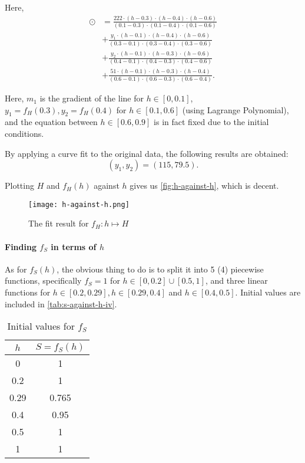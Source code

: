 Here,
\begin{align*}
    \odot & = \frac{222 \cdot (h - 0.3) \cdot (h - 0.4) \cdot (h - 0.6)}{(0.1 - 0.3) \cdot (0.1 - 0.4) \cdot (0.1 - 0.6)} \\
          & + \frac{y_1 \cdot (h - 0.1) \cdot (h - 0.4) \cdot (h - 0.6)}{(0.3 - 0.1) \cdot (0.3 - 0.4) \cdot (0.3 - 0.6)} \\
          & + \frac{y_2 \cdot (h - 0.1) \cdot (h - 0.3) \cdot (h - 0.6)}{(0.4 - 0.1) \cdot (0.4 - 0.3) \cdot (0.4 - 0.6)} \\
          & + \frac{51 \cdot (h - 0.1) \cdot (h - 0.3) \cdot (h - 0.4)}{(0.6 - 0.1) \cdot (0.6 - 0.3) \cdot (0.6 - 0.4)}.
\end{align*}

Here, \(m_1\) is the gradient of the line for \(h \in [0, 0.1]\), \(y_1 = f_H(0.3), y_2 = f_H(0.4)\) for \(h \in [0.1, 0.6]\) (using Lagrange Polynomial), and the equation between \(h \in [0.6, 0.9]\) is in fact fixed due to the initial conditions.

By applying a curve fit to the original data, the following results are obtained:
\[
    (y_1, y_2) = (115, 79.5).
\]

Plotting \(H\) and \(f_H(h)\) against \(h\) gives us \autoref{fig:h-against-h}, which is decent.

\begin{figure}[htp]
    \centering
    \texttt{[image: h-against-h.png]}
    \caption{The fit result for \(f_H: h \mapsto H\)}
    \label{fig:h-against-h}
\end{figure}

\paragraph{Finding \(f_S\) in terms of \(h\)}

As for \(f_S(h)\), the obvious thing to do is to split it into 5 (4) piecewise functions, specifically \(f_S = 1\) for \(h \in [0, 0.2] \cup [0.5, 1]\), and three linear functions for \(h \in [0.2, 0.29], h \in [0.29, 0.4]\) and \(h \in [0.4, 0.5]\). Initial values are included in \autoref{tab:s-against-h-iv}.

\begin{table}[htp]
    \centering

    \begin{tabular}{cc}
        \(h\) & \(S = f_S(h)\) \\
        \hline
        0     & 1              \\
        0.2   & 1              \\
        0.29  & 0.765          \\
        0.4   & 0.95           \\
        0.5   & 1              \\
        1     & 1
    \end{tabular}
    \caption{Initial values for \(f_S\)}
    \label{tab:s-against-h-iv}
\end{table}

